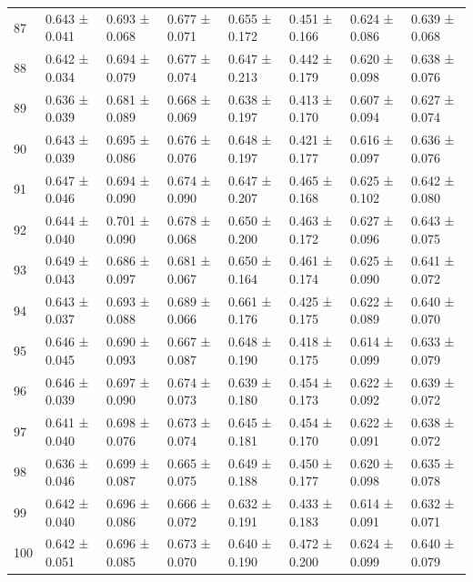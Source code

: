 \begin{tabular}{llllllll}
87 & 0.643 ± 0.041 & 0.693 ± 0.068 & 0.677 ± 0.071 & 0.655 ± 0.172 & 0.451 ± 0.166 & 0.624 ± 0.086 & 0.639 ± 0.068 \\
88 & 0.642 ± 0.034 & 0.694 ± 0.079 & 0.677 ± 0.074 & 0.647 ± 0.213 & 0.442 ± 0.179 & 0.620 ± 0.098 & 0.638 ± 0.076 \\
89 & 0.636 ± 0.039 & 0.681 ± 0.089 & 0.668 ± 0.069 & 0.638 ± 0.197 & 0.413 ± 0.170 & 0.607 ± 0.094 & 0.627 ± 0.074 \\
90 & 0.643 ± 0.039 & 0.695 ± 0.086 & 0.676 ± 0.076 & 0.648 ± 0.197 & 0.421 ± 0.177 & 0.616 ± 0.097 & 0.636 ± 0.076 \\
91 & 0.647 ± 0.046 & 0.694 ± 0.090 & 0.674 ± 0.090 & 0.647 ± 0.207 & 0.465 ± 0.168 & 0.625 ± 0.102 & 0.642 ± 0.080 \\
92 & 0.644 ± 0.040 & 0.701 ± 0.090 & 0.678 ± 0.068 & 0.650 ± 0.200 & 0.463 ± 0.172 & 0.627 ± 0.096 & 0.643 ± 0.075 \\
93 & 0.649 ± 0.043 & 0.686 ± 0.097 & 0.681 ± 0.067 & 0.650 ± 0.164 & 0.461 ± 0.174 & 0.625 ± 0.090 & 0.641 ± 0.072 \\
94 & 0.643 ± 0.037 & 0.693 ± 0.088 & 0.689 ± 0.066 & 0.661 ± 0.176 & 0.425 ± 0.175 & 0.622 ± 0.089 & 0.640 ± 0.070 \\
95 & 0.646 ± 0.045 & 0.690 ± 0.093 & 0.667 ± 0.087 & 0.648 ± 0.190 & 0.418 ± 0.175 & 0.614 ± 0.099 & 0.633 ± 0.079 \\
96 & 0.646 ± 0.039 & 0.697 ± 0.090 & 0.674 ± 0.073 & 0.639 ± 0.180 & 0.454 ± 0.173 & 0.622 ± 0.092 & 0.639 ± 0.072 \\
97 & 0.641 ± 0.040 & 0.698 ± 0.076 & 0.673 ± 0.074 & 0.645 ± 0.181 & 0.454 ± 0.170 & 0.622 ± 0.091 & 0.638 ± 0.072 \\
98 & 0.636 ± 0.046 & 0.699 ± 0.087 & 0.665 ± 0.075 & 0.649 ± 0.188 & 0.450 ± 0.177 & 0.620 ± 0.098 & 0.635 ± 0.078 \\
99 & 0.642 ± 0.040 & 0.696 ± 0.086 & 0.666 ± 0.072 & 0.632 ± 0.191 & 0.433 ± 0.183 & 0.614 ± 0.091 & 0.632 ± 0.071 \\
100 & 0.642 ± 0.051 & 0.696 ± 0.085 & 0.673 ± 0.070 & 0.640 ± 0.190 & 0.472 ± 0.200 & 0.624 ± 0.099 & 0.640 ± 0.079 \\
\bottomrule
\end{tabular}
